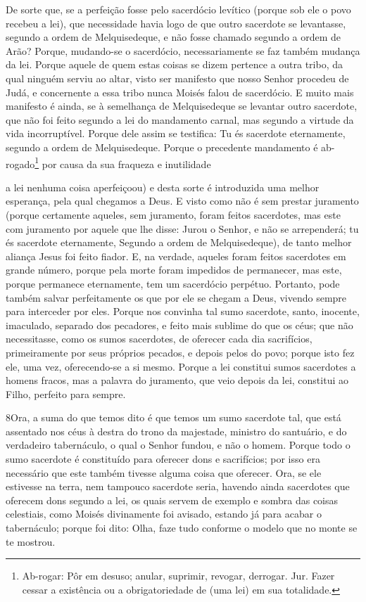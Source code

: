 De sorte que, se a perfeição fosse pelo sacerdócio levítico
(porque sob ele o povo recebeu a lei), que necessidade havia logo de
que outro sacerdote se levantasse, segundo a ordem de Melquisedeque,
e não fosse chamado segundo a ordem de Arão? Porque,
mudando-se o sacerdócio, necessariamente se faz também mudança da
lei. Porque aquele de quem estas coisas se dizem pertence a
outra tribo, da qual ninguém serviu ao altar, visto ser
manifesto que nosso Senhor procedeu de Judá, e concernente a essa
tribo nunca Moisés falou de sacerdócio. E muito mais
manifesto é ainda, se à semelhança de Melquisedeque se levantar
outro sacerdote, que não foi feito segundo a lei do
mandamento carnal, mas segundo a virtude da vida incorruptível.
Porque dele assim se testifica: Tu és sacerdote eternamente,
segundo a ordem de Melquisedeque. Porque o precedente
mandamento é ab-rogado\footnote{Ab-rogar: Pôr em desuso; anular,
suprimir, revogar, derrogar. Jur. Fazer cessar a existência ou a
obrigatoriedade de (uma lei) em sua totalidade.} por causa da sua
fraqueza e inutilidade

a lei nenhuma coisa aperfeiçoou) e desta sorte é introduzida
uma melhor esperança, pela qual chegamos a Deus. E visto como
não é sem prestar juramento (porque certamente aqueles, sem
juramento, foram feitos sacerdotes, mas este com juramento
por aquele que lhe disse: Jurou o Senhor, e não se arrependerá; tu
és sacerdote eternamente, Segundo a ordem de Melquisedeque),
de tanto melhor aliança Jesus foi feito fiador. E, na
verdade, aqueles foram feitos sacerdotes em grande número, porque
pela morte foram impedidos de permanecer, mas este, porque
permanece eternamente, tem um sacerdócio perpétuo. Portanto,
pode também salvar perfeitamente os que por ele se chegam a Deus,
vivendo sempre para interceder por eles. Porque nos convinha
tal sumo sacerdote, santo, inocente, imaculado, separado dos
pecadores, e feito mais sublime do que os céus; que não
necessitasse, como os sumos sacerdotes, de oferecer cada dia
sacrifícios, primeiramente por seus próprios pecados, e depois pelos
do povo; porque isto fez ele, uma vez, oferecendo-se a si mesmo.
Porque a lei constitui sumos sacerdotes a homens fracos, mas
a palavra do juramento, que veio depois da lei, constitui ao Filho,
perfeito para sempre.

\medskip

\lettrine{8} Ora, a suma do que temos dito é que temos um sumo
sacerdote tal, que está assentado nos céus à destra do trono da
majestade, ministro do santuário, e do verdadeiro tabernáculo, o
qual o Senhor fundou, e não o homem. Porque todo o sumo
sacerdote é constituído para oferecer dons e sacrifícios; por isso
era necessário que este também tivesse alguma coisa que oferecer.
Ora, se ele estivesse na terra, nem tampouco sacerdote seria,
havendo ainda sacerdotes que oferecem dons segundo a lei, os
quais servem de exemplo e sombra das coisas celestiais, como Moisés
divinamente foi avisado, estando já para acabar o tabernáculo;
porque foi dito: Olha, faze tudo conforme o modelo que no monte se
te mostrou.

